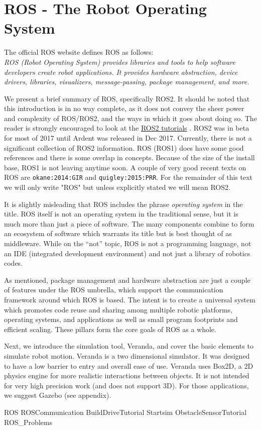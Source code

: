 \hypertarget{Chap:ROS}{%
\section{ROS - The Robot Operating System}\label{Chap:ROS}}

The official ROS website defines ROS as follows:\\
\emph{ROS (Robot Operating System) provides libraries and tools to help
software developers create robot applications. It provides hardware
abstraction, device drivers, libraries, visualizers, message-passing,
package management, and more.}

We present a brief summary of ROS, specifically ROS2. It should be noted
that this introduction is in no way complete, as it does not convey the
sheer power and complexity of ROS/ROS2, and the ways in which it goes
about doing so. The reader is strongly encouraged to look at the
\href{https://github.com/ros2/ros2/wiki/Tutorials}{ROS2 tutorials} .
ROS2 was in beta for most of 2017 until Ardent was released in Dec 2017.
Currently, there is not a significant collection of ROS2 information.
ROS (ROS1) does have some good references and there is some overlap in
concepts. Because of the size of the install base, ROS1 is not leaving
anytime soon. A couple of very good recent texts on ROS are
\texttt{okane:2014:GIR} and \texttt{quigley:2015:PRR}. For the remainder
of this text we will only write "ROS" but unless explicitly stated we
will mean ROS2.

It is slightly misleading that ROS includes the phrase \emph{operating
system} in the title. ROS itself is not an operating system in the
traditional sense, but it is much more than just a piece of software.
The many components combine to form an ecosystem of software which
warrants its title but is best thought of as middleware. While on the
``not'' topic, ROS is not a programming language, not an IDE (integrated
development environment) and not just a library of robotics codes.

As mentioned, package management and hardware abstraction are just a
couple of features under the ROS umbrella, which support the
communication framework around which ROS is based. The intent is to
create a universal system which promotes code reuse and sharing among
multiple robotic platforms, operating systems, and applications as well
as small program footprints and efficient scaling. These pillars form
the core goals of ROS as a whole.

Next, we introduce the simulation tool, Veranda, and cover the basic
elements to simulate robot motion. Veranda is a two dimensional
simulator. It was designed to have a low barrier to entry and overall
ease of use. Veranda uses Box2D, a 2D physics engine for more realistic
interactions between objects. It is not intended for very high precision
work (and does not support 3D). For those applications, we suggest
Gazebo (see appendix).

ROS ROSCommunication BuildDriveTutorial Startsim ObstacleSensorTutorial
ROS\_Problems
